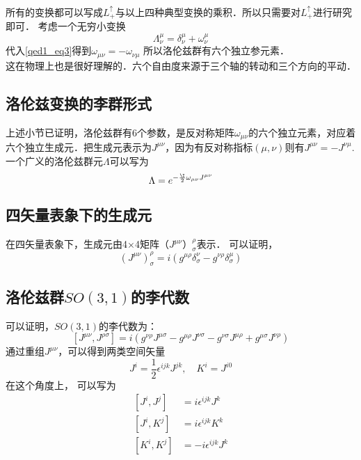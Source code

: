 所有的变换都可以写成$L_{+}^{\uparrow}$与以上四种典型变换的乘积．所以只需要对$L_{+}^{\uparrow}$进行研究即可．
考虑一个无穷小变换
\begin{equation}\Lambda_{\nu}^{\mu}=\delta_{\nu}^{\mu}+\omega_{\nu}^{\mu}\end{equation}
代入\autoref{qed1_eq3}得到$\omega_{\mu \nu}=-\omega_{\nu \mu}$
所以洛伦兹群有六个独立参元素．\\
这在物理上也是很好理解的．六个自由度来源于三个轴的转动和三个方向的平动．
\subsection{洛伦兹变换的李群形式}
上述小节已证明，洛伦兹群有6个参数，是反对称矩阵$\omega_{\mu\nu}$的六个独立元素，对应着六个独立生成元．把生成元表示为$J^{\mu\nu}$，因为有反对称指标$(\mu,\nu)$则有$J^{\mu\nu}=-J^{\nu\mu}$.一个广义的洛伦兹群元$\Lambda$可以写为
\begin{equation}
\Lambda=e^{-\frac{\I}{2} \omega_{\mu\nu}J^{\mu\nu}}
\end{equation}
\subsection{四矢量表象下的生成元}
在四矢量表象下，生成元由4×4矩阵$（J^{\mu\nu}）_\sigma^\rho$表示．
可以证明，
\begin{equation}\left(J^{\mu \nu}\right)_{\sigma}^{\rho}=i\left(g^{\mu \rho} \delta_{\sigma}^{\nu}-g^{\nu \rho} \delta_{\sigma}^{\mu}\right)\end{equation}
\subsection{洛伦兹群$SO(3,1)$的李代数}
可以证明，$SO(3,1)$的李代数为：
\begin{equation}\left[J^{\mu \nu}, J^{\rho \sigma}\right]=i\left(g^{\nu \rho} J^{\mu \sigma}-g^{\mu \rho} J^{\nu \sigma}-g^{\nu \sigma} J^{\mu \rho}+g^{\mu \sigma} J^{\nu \rho}\right)\end{equation}
通过重组$J^{\mu\nu}$，可以得到两类空间矢量
\begin{equation}J^{i}=\frac{1}{2} \epsilon^{i j k} J^{j k}, \quad K^{i}=J^{i 0}\end{equation}
在这个角度上， 可以写为
\begin{equation}\begin{aligned}
\left[J^{i}, J^{j}\right] &=i \epsilon^{i j k} J^{k} \\
\left[J^{i}, K^{j}\right] &=i \epsilon^{i j k} K^{k} \\
\left[K^{i}, K^{j}\right] &=-i \epsilon^{i j k} J^{k}
\end{aligned}\end{equation}
